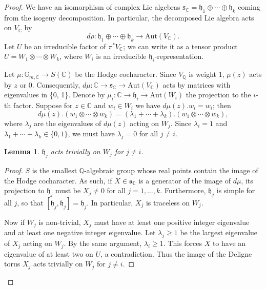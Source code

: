 \documentclass[12pt]{amsart}
\newcommand{\Q}{\mathbb{Q}}
\newcommand{\C}{\mathbb{C}}
\newcommand{\Aut}{\mathrm{Aut}}
\newtheorem{lemma}[theorem]{Lemma}
\theoremstyle{definition}
\numberwithin{equation}{section}
\begin{document}
\begin{proof}
We have an isomorphism of complex Lie algebras 
\(\mathfrak{s}_\C = \mathfrak{h}_1 \oplus \cdots \oplus \mathfrak{h}_k\) coming from the 
isogeny decomposition. In particular, the decomposed Lie algebra acts on \(V_\C\) by 
\[d\rho: \mathfrak{h}_1 \oplus \cdots \oplus \mathfrak{h}_k \to \mathrm{Aut}(V_\C).\]
Let \(U\) be an irreducible factor of \(\pi^* V_\C\); we can write it as 
a tensor product \(U = W_1 \otimes \cdots \otimes W_k\), where \(W_i\) is an 
irreducible \(\mathfrak{h}_i\)-representation. 

Let \(\mu: \mathbb{G}_{m, \C} \to S(\C)\) be the Hodge cocharacter. Since 
\(V_\Q\) is weight 1, \(\mu(z)\) acts by \(z\) or \(0\). Consequently, 
\(d\mu: \C \to \mathfrak{s}_\C \to \mathrm{Aut}(V_\C)\) acts by matrices with
eigenvalues in \{0, 1\}. Denote by \(\mu_i: \C \to \mathfrak{h}_i \to \Aut(W_i)\)
the projection to the \(i\)-th factor. Suppose for \(z \in \C\) and \(w_i \in W_i\) 
we have \(d\mu(z).w_i = w_i\); then 
\begin{equation*}
    d\mu(z).(w_1 \otimes \cdots \otimes w_k) = 
    (\lambda_1 + \cdots + \lambda_k).(w_1 \otimes \cdots \otimes w_k),
\end{equation*}
where \(\lambda_j\) are the eigenvalues of \(d\mu(z)\) acting on \(W_j\). 
Since \(\lambda_i = 1\) and \(\lambda_1 + \cdots + \lambda_k \in \{0, 1\}\), 
we must have \(\lambda_j = 0\) for all \(j \neq i\). 

\begin{lemma}
    \(\mathfrak{h}_j\) acts trivially on \(W_j\) for \(j \neq i\). 
\end{lemma}

\begin{proof}
\(S\) is the smallest \(\Q\)-algebraic group whose real points contain the 
image of the Hodge cocharacter. As such, if \(X \in \mathfrak{s}_\C\) is a generator 
of the image of \(d\mu\), its projection to \(\mathfrak{h}_j\) must be
\(X_j \neq 0\) for all \(j=1,\dots, k\). Furthermore, \(\mathfrak{h}_j\) is 
simple for all \(j\), so that \([\mathfrak{h}_j, \mathfrak{h}_j] = \mathfrak{h}_j\).
In particular, \(X_j\) is traceless on \(W_j\).

Now if \(W_j\) is non-trivial, \(X_j\) must have at least one positive integer 
eigenvalue and at least one negative integer eigenvalue. Let \(\lambda_j \geq 1\) 
be the largest eigenvalue of \(X_j\) acting on \(W_j\). By the same argument, 
\(\lambda_i \geq 1\). This forces \(X\) to have an eigenvalue of at least two 
on \(U\), a contradiction. Thus the image of the Deligne torus \(X_j\) acts 
trivially on \(W_j\) for \(j \neq i\).


\end{proof}
\end{proof}
\end{document}
